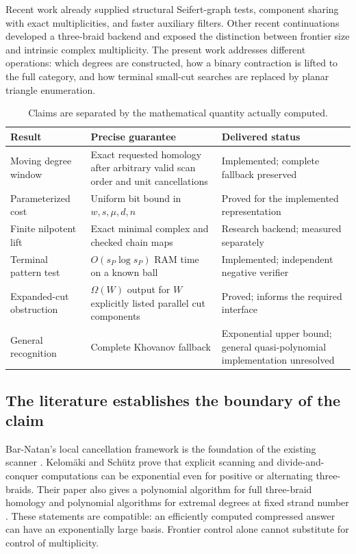 \documentclass[11pt,letterpaper]{article}
\theoremstyle{definition}
\theoremstyle{remark}
\begin{document}
Recent work already supplied structural Seifert-graph tests,
component sharing with exact multiplicities, and faster auxiliary filters.
Other recent continuations developed a three-braid backend and exposed
the distinction between frontier size and intrinsic complex multiplicity.
The present work addresses different operations: which degrees are
constructed, how a binary contraction is lifted to the full category,
and how terminal small-cut searches are replaced by planar triangle
enumeration.

\begin{table}[ht]
\centering\small
\begin{tabular}{p{}p{}p{}}
\toprule
Result & Precise guarantee & Delivered status\\
\midrule
Moving degree window & Exact requested homology after arbitrary valid
scan order and unit cancellations & Implemented; complete fallback preserved\\
Parameterized cost & Uniform bit bound in $w,s,\mu,d,n$ & Proved for the
implemented representation\\
Finite nilpotent lift & Exact minimal complex and checked chain maps &
Research backend; measured separately\\
Terminal pattern test & $O(s_P\log s_P)$ RAM time on a known ball &
Implemented; independent negative verifier\\
Expanded-cut obstruction & $\Omega(W)$ output for $W$ explicitly listed
parallel cut components & Proved; informs the required interface\\
General recognition & Complete Khovanov fallback & Exponential upper bound;
general quasi-polynomial implementation unresolved\\
\bottomrule
\end{tabular}
\caption{Claims are separated by the mathematical quantity actually computed.}
\end{table}

\subsection{The literature establishes the boundary of the claim}

Bar-Natan's local cancellation framework is the foundation of the existing
scanner \cite{barnatan}.  Kelom\"aki and Sch\"utz prove that explicit
scanning and divide-and-conquer computations can be exponential even for
positive or alternating three-braids.  Their paper also gives a polynomial
algorithm for full three-braid homology and polynomial algorithms for
extremal degrees at fixed strand number \cite{kelomaki}.  These statements
are compatible: an efficiently computed compressed answer can have an
exponentially large basis.  Frontier control alone cannot substitute for
control of multiplicity.
\end{document}
